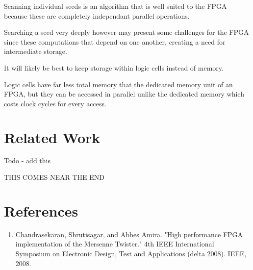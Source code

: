 \documentclass{article}
\begin{document}
\begin{multicols}{2}
    Scanning individual seeds is an algorithm that is well suited to the FPGA
    because these are completely independant parallel operations.

    Searching a seed very deeply however may present some challenges for the
    FPGA since these computations that depend on one another, creating a
    need for intermediate storage.

    It will likely be best to keep storage within logic cells instead of memory.

    Logic cells have far less total memory that the dedicated memory unit of an FPGA,
    but they can be accessed in parallel unlike the dedicated memory which costs
    clock cycles for every access.
    
    \section{Related Work}

    Todo - add this

    THIS COMES NEAR THE END

    
    \end{multicols}

    \break
    \section*{References}

    \begin{enumerate}

    \item Chandrasekaran, Shrutisagar, and Abbes Amira. "High performance FPGA implementation of the Mersenne Twister." 4th IEEE International Symposium on Electronic Design, Test and Applications (delta 2008). IEEE, 2008.

    \end{enumerate}
    
\end{document}

